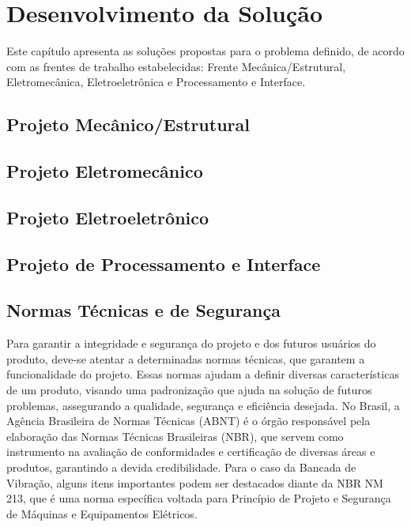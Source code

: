 \chapter{Desenvolvimento da Solução}
\label{desenvolvimento}

Este capítulo apresenta as soluções propostas para o problema definido, de acordo com as frentes de trabalho estabelecidas: Frente Mecânica/Estrutural, Eletromecânica, Eletroeletrônica e Processamento e Interface.

\section{Projeto Mecânico/Estrutural}



\section{Projeto Eletromecânico}



\section{Projeto Eletroeletrônico}



\section{Projeto de Processamento e Interface}



\section{Normas Técnicas e de Segurança}
Para garantir a integridade e segurança do projeto e dos futuros usuários do produto, deve-se atentar a determinadas normas técnicas, que garantem a funcionalidade do projeto. Essas normas ajudam a definir diversas características de um produto, visando uma padronização que ajuda na solução de futuros problemas, assegurando a qualidade, segurança e eficiência desejada.
	No Brasil, a Agência Brasileira de Normas Técnicas (ABNT) é o órgão responsável pela elaboração das Normas Técnicas Brasileiras (NBR), que servem como instrumento na avaliação de conformidades e certificação de diversas áreas e produtos, garantindo a devida credibilidade. Para o caso da Bancada de Vibração, alguns itens importantes podem ser destacados diante da NBR NM 213, que é uma norma específica voltada para Princípio de Projeto e Segurança de Máquinas e Equipamentos Elétricos.
    
